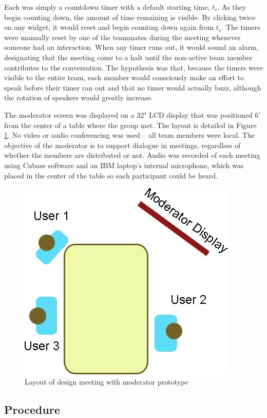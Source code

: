 Each was simply a countdown timer with a default starting time, $t_{s}$. As they begin counting down, the amount of time remaining is visible. By clicking twice on any widget, it would reset and begin counting down again from $t_{s}$. The timers were manually reset by one of the teammates during the meeting whenever someone had an interaction. When any timer runs out, it would sound an alarm, designating that the meeting come to a halt until the non-active team member contributes to the conversation. The hypothesis was that, because the timers were visible to the entire team, each member would consciously make an effort to speak before their timer ran out and that no timer would actually buzz, although the rotation of speakers would greatly increase.

The moderator screen was displayed on a 32" LCD display that was positioned 6' from the center of a table where the group met. The layout is detailed in Figure \ref{fig:moderator_setup}. No video or audio conferencing was used -- all team members were local. The objective of the moderator is to support dialogue in meetings, regardless of whether the members are distributed or not. Audio was recorded of each meeting using Cubase software and an IBM laptop's internal microphone, which was placed in the center of the table so each participant could be heard. 

\begin{figure}[h]
	\centering
		\includegraphics[width=.75\textwidth]{Figures/Ch5/moderator_setup.jpg}
	\caption{Layout of design meeting with moderator prototype}
	\label{fig:moderator_setup}
\end{figure}

\subsection{Procedure}

